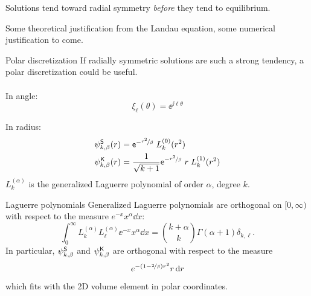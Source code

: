 \documentclass[hyperref={bookmarksopen, colorlinks, linkcolor=blue, urlcolor=green, citecolor=red}, color={usenames,dvipsnames}]{beamer}
\begin{document}
\begin{frame}
Solutions tend toward radial symmetry {\em before} they tend to equilibrium.
\begin{figure}
\centering
{}
\end{figure}
Some theoretical justification from the Landau equation, some numerical justification to come.
\end{frame}

\begin{frame}{Polar discretization}
If radially symmetric solutions are such a strong tendency, a polar discretization could be useful. \\~\\

In angle: 
\[
    \xi_\ell(\theta) = \ee^{\ii \ell \theta}
\]

In radius:
\begin{align*}
    \psi_{k,\beta}^{\mathsf{S}}(r) &= \mathsf{e}^{-\nicefrac{r^2}{\beta}} \; L_k^{(0)}(r^2) \\
    \psi_{k,\beta}^{\mathsf{K}}(r) &= \frac{1}{\sqrt{k+1}} \mathsf{e}^{-\nicefrac{r^2}{\beta}} \; r \; L_k^{(1)}(r^2)
\end{align*}
$L_k^{(\alpha)}$ is the generalized Laguerre polynomial of order $\alpha$, degree $k$.
\end{frame}

\begin{frame}{Laguerre polynomials}
Generalized Laguerre polynomials are orthogonal on $[0,\infty)$ with respect to the measure
$e^{-x}x^{\alpha}\dd x$:
\[
    \int_0^\infty L^{(\alpha)}_k L^{(\alpha)}_\ell \ee^{-x}x^\alpha \dd x 
    = \binom{k+\alpha}{k} \Gamma(\alpha + 1) \delta_{k,\ell}.
\]
In particular, $\psi_{k,\beta}^{\mathsf{S}}$ and $\psi_{k,\beta}^{\mathsf{K}}$ are orthogonal with respect to the measure
\[
    e^{-(1-\nicefrac{2}{\beta})r^2} r \,\text{d} r
\]
which fits with the 2D volume element in polar coordinates.
\end{frame}
\end{document}
